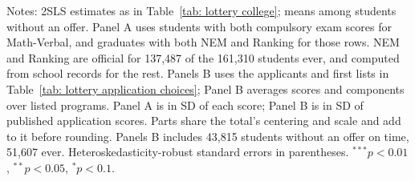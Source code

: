 \begin{table}[htp!]
\singlespacing\renewcommand{\arraystretch}{1.0}
\centering
\caption{{Effect of Attending an Over-Demanded School on Admission Scores and Cutoff Attainment}}\label{tab: lottery scores}
\small
\setlength{\tabcolsep}{6pt}

\par\smallskip
\begin{minipage}{\textwidth}\footnotesize
{Notes: 2SLS estimates as in Table~\ref{tab: lottery college}; means among students without an offer. Panel A uses students with both compulsory exam scores for Math-Verbal, and graduates with both NEM and Ranking for those rows. NEM and Ranking are official for 137,487 of the 161,310 students ever, and computed from school records for the rest. Panels B uses the applicants and first lists in Table~\ref{tab: lottery application choices}; Panel B averages scores and components over listed programs. Panel A is in SD of each score; Panel B is in SD of published application scores. Parts share the total's centering and scale and add to it before rounding. Panels B includes 43,815 students without an offer on time, 51,607 ever. Heteroskedasticity-robust standard errors in parentheses. $^{***}p<0.01$, $^{**}p<0.05$, $^{*}p<0.1$.}
\end{minipage}
\end{table}
